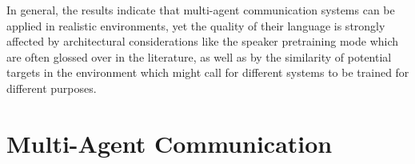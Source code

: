 In general, the results indicate that multi-agent communication systems can be applied in realistic environments, yet the quality of their language is strongly affected by architectural considerations like the speaker pretraining mode which are often glossed over in the literature, as well as by the similarity of potential targets in the environment which might call for different systems to be trained for different purposes.

\section{Multi-Agent Communication}


